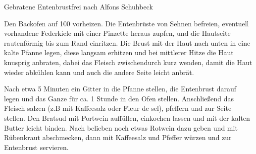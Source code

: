 \begin{recipe}{Gebratene Entenbrust}{frei nach Alfons Schuhbeck}
  \label{Gebratene Entenbrust}
  \inglist
  
  \steps
  Den Backofen auf 100 \celsius vorheizen. Die Entenbrüste von Sehnen befreien, eventuell
  vorhandene Federkiele mit einer Pinzette heraus zupfen, und die Hautseite rautenförmig
  bis zum Rand einritzen. Die Brust mit der Haut nach unten in eine kalte Pfanne legen,
  diese langsam erhitzen und bei mittlerer Hitze die Haut knusprig anbraten, dabei das
  Fleisch zwischendurch kurz wenden, damit die Haut wieder abkühlen kann und auch die
  andere Seite leicht anbrät.

  Nach etwa 5 Minuten ein Gitter in die Pfanne stellen, die Entenbrust darauf legen und
  das Ganze für ca. 1 Stunde in den Ofen stellen. Anschließend das Fleisch salzen (z.B mit
  Kaffeesalz oder Fleur de sel), pfeffern und zur Seite stellen. Den Bratsud mit Portwein
  auffüllen, einkochen lassen und mit der kalten Butter leicht binden. Nach belieben noch
  etwas Rotwein dazu geben und mit Rübenkraut abschmecken, dann mit Kaffeesalz und Pfeffer
  würzen und zur Entenbrust servieren.
\end{recipe}


